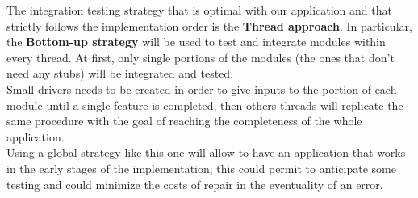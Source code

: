 The integration testing strategy that is optimal with our application and that strictly follows the implementation order is the \textbf{Thread approach}. In particular, the \textbf{Bottom-up strategy} will be used to test and integrate modules within every thread. At first, only single portions of the modules (the ones that don't need any stubs) will be integrated and tested.
\\Small drivers needs to be created in order to give inputs to the portion of each module until a single feature is completed, then others threads will replicate the same procedure with the goal of reaching the completeness of the whole application.
\\Using a global strategy like this one will allow to have an application that works in the early stages of the implementation; this could permit to anticipate some testing and could minimize the costs of repair in the eventuality of an error.
